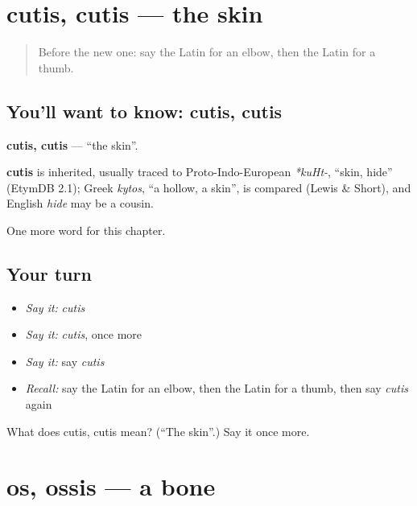 \section[cutis, cutis]{cutis, cutis — the skin}

\label{lesson:LA-C136-cutis}



\begin{quote}
Before the new one: say the Latin for an elbow, then the Latin for a thumb.
\end{quote}

\subsection*{You'll want to know: cutis, cutis}
\textbf{cutis, cutis} — \textquotedblleft{}the skin\textquotedblright{}.

\begin{cousinweb}
\textbf{cutis} is inherited, usually traced to Proto-Indo-European \emph{*kuHt-}, \textquotedblleft{}skin, hide\textquotedblright{} (EtymDB 2.1); Greek \emph{kytos}, \textquotedblleft{}a hollow, a skin\textquotedblright{}, is compared (Lewis \& Short), and English \emph{hide} may be a cousin.
\end{cousinweb}

\begin{grammarlens}[title={What you've built}]
One more word for this chapter.
\end{grammarlens}

\subsection*{Your turn}
\begin{itemize}
\raggedright
  \item \emph{Say it:} \emph{cutis}
  \item \emph{Say it:} \emph{cutis}, once more
  \item \emph{Say it:} say \emph{cutis}
  \item \emph{Recall:} say the Latin for an elbow, then the Latin for a thumb, then say \emph{cutis} again
\end{itemize}

\begin{tcolorbox}[breakable,colback=teal!4,colframe=teal!35!black,title={Before you move on}]
What does cutis, cutis mean? (\textquotedblleft{}The skin\textquotedblright{}.) Say it once more.
\end{tcolorbox}
\section[os, ossis]{os, ossis — a bone}

